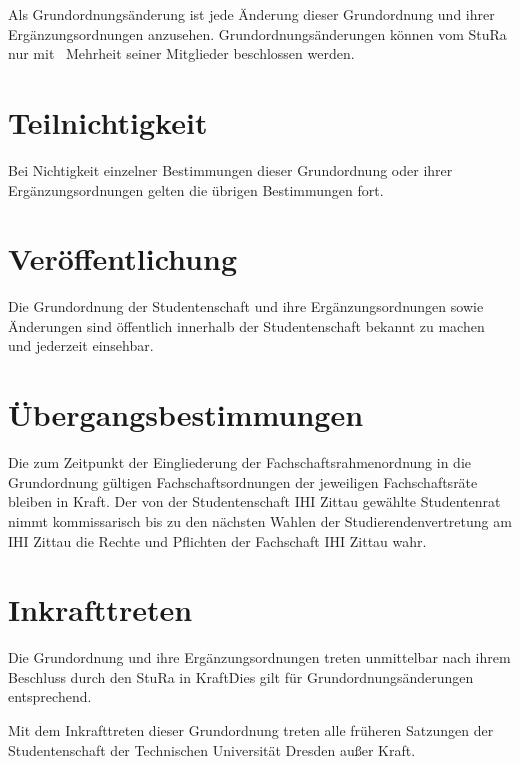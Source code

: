 \begin{multicols}{2}
\Abs \Satz Als Grundordnungsänderung ist jede Änderung dieser Grundordnung und ihrer Ergänzungsordnungen anzusehen. Grundordnungsänderungen können vom StuRa nur mit ~Mehrheit seiner Mitglieder beschlossen werden.



\section{Teilnichtigkeit}

\Abs \Satz Bei Nichtigkeit einzelner Bestimmungen dieser Grundordnung oder ihrer Ergänzungsordnungen gelten die übrigen Bestimmungen fort.



\section{Veröffentlichung}

\Abs \Satz Die Grundordnung der Studentenschaft und ihre Ergänzungsordnungen sowie Änderungen sind öffentlich innerhalb der Studentenschaft bekannt zu machen und jederzeit einsehbar.



\section{Übergangsbestimmungen}

\Abs \Satz Die zum Zeitpunkt der Eingliederung der Fachschaftsrahmenordnung in die Grundordnung gültigen Fachschaftsordnungen der jeweiligen Fachschaftsräte bleiben in Kraft.
\Abs \Satz Der von der Studentenschaft IHI Zittau gewählte Studentenrat nimmt kommissarisch bis zu den nächsten Wahlen der Studierendenvertretung am IHI Zittau die Rechte und Pflichten der Fachschaft IHI Zittau wahr.


\section{Inkrafttreten}

\Abs \Satz Die Grundordnung und ihre Ergänzungsordnungen treten unmittelbar nach ihrem Beschluss durch den StuRa in Kraft\. Dies gilt für Grundordnungsänderungen entsprechend.

\Abs \Satz Mit dem Inkrafttreten dieser Grundordnung treten alle früheren Satzungen der Studentenschaft der Technischen Universität Dresden außer Kraft.

\end{multicols}

